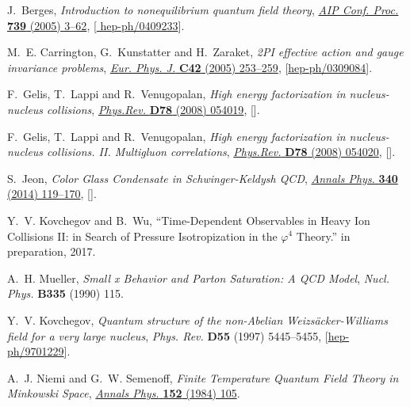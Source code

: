 \documentclass[onecolumn,showpacs,nobibnotes,nofootinbib,12pt,aps,prd,showpacs,notitlepage,nofootinbib,preprintnumbers,amsmath,amssymb]{article}
\begin{document}
\begin{thebibliography}{10}
J.~Berges, \emph{{Introduction to nonequilibrium quantum field theory}},
  \href{https://doi.org/10.1063/1.1843591}{\emph{AIP Conf. Proc.} {\bfseries
  739} (2005) 3--62}, [\href{https://arxiv.org/abs/hep-ph/0409233}{{\ttfamily
  hep-ph/0409233}}].

M.~E. Carrington, G.~Kunstatter and H.~Zaraket, \emph{{2PI effective action and
  gauge invariance problems}},
  \href{https://doi.org/10.1140/epjc/s2005-02277-x}{\emph{Eur. Phys. J.}
  {\bfseries C42} (2005) 253--259},
  [\href{https://arxiv.org/abs/hep-ph/0309084}{{\ttfamily hep-ph/0309084}}].

F.~Gelis, T.~Lappi and R.~Venugopalan, \emph{{High energy factorization in
  nucleus-nucleus collisions}},
  \href{https://doi.org/10.1103/PhysRevD.78.054019}{\emph{Phys.Rev.} {\bfseries
  D78} (2008) 054019}, [\href{https://arxiv.org/abs/0804.2630}{{}}].

F.~Gelis, T.~Lappi and R.~Venugopalan, \emph{{High energy factorization in
  nucleus-nucleus collisions. II. Multigluon correlations}},
  \href{https://doi.org/10.1103/PhysRevD.78.054020}{\emph{Phys.Rev.} {\bfseries
  D78} (2008) 054020}, [\href{https://arxiv.org/abs/0807.1306}{{}}].

S.~Jeon, \emph{{Color Glass Condensate in Schwinger-Keldysh QCD}},
  \href{https://doi.org/10.1016/j.aop.2013.09.019}{\emph{Annals Phys.}
  {\bfseries 340} (2014) 119--170},
  [\href{https://arxiv.org/abs/1308.0263}{{}}].

Y.~V. Kovchegov and B.~Wu, ``{{\boldmath Time-Dependent Observables in Heavy
  Ion Collisions II: in Search of Pressure Isotropization in the $\varphi^4$
  Theory}}.'' in preparation, 2017.

A.~H. Mueller, \emph{{Small x Behavior and Parton Saturation: A QCD Model}},
  {\emph{Nucl. Phys.} {\bfseries B335} (1990) 115}.

Y.~V. Kovchegov, \emph{{Quantum structure of the non-Abelian
  Weizs\"{a}cker-Williams field for a very large nucleus}}, {\emph{Phys. Rev.}
  {\bfseries D55} (1997) 5445--5455},
  [\href{https://arxiv.org/abs/hep-ph/9701229}{{\ttfamily hep-ph/9701229}}].

A.~J. Niemi and G.~W. Semenoff, \emph{{Finite Temperature Quantum Field Theory
  in Minkowski Space}},
  \href{https://doi.org/10.1016/0003-4916(84)90082-4}{\emph{Annals Phys.}
  {\bfseries 152} (1984) 105}.


\end{thebibliography}
\end{document}
